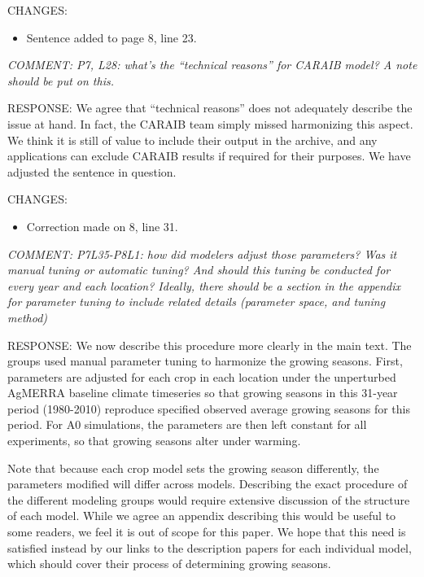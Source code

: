 \documentclass[gmd, manuscript]{copernicus} %
\begin{document}
CHANGES:
\begin{itemize}
    \item Sentence added to page 8, line 23.
\end{itemize}

\smallskip

\textcolor{dark-gray}{\textit{COMMENT: P7, L28: what’s the “technical reasons” for CARAIB model? A note should be put on this.}}

RESPONSE: We agree that “technical reasons” does not adequately describe the issue at hand. In fact, the CARAIB team simply missed harmonizing this aspect. We think it is still of value to include their output in the archive, and any applications can exclude CARAIB results if required for their purposes. We have adjusted the sentence in question.
\smallskip

CHANGES:
\begin{itemize}
    \item Correction made on 8, line 31.
\end{itemize}

\smallskip

\textcolor{dark-gray}{\textit{COMMENT: P7L35-P8L1: how did modelers adjust those parameters? Was it manual tuning or automatic tuning? And should this tuning be conducted for every year and each location? Ideally, there should be a section in the appendix for parameter tuning to include related details (parameter space, and tuning method)}}

RESPONSE: We now describe this procedure more clearly in the main text. The groups used manual parameter tuning to harmonize the growing seasons. First, parameters are adjusted for each crop in each location under the unperturbed AgMERRA baseline climate timeseries so that growing seasons in this 31-year period (1980-2010) reproduce specified observed average growing seasons for this period. For A0 simulations, the parameters are then left constant for all experiments, so that growing seasons alter under warming. 

Note that because each crop model sets the growing season differently, the parameters modified will differ across models. Describing the exact procedure of the different modeling groups would require extensive discussion of the structure of each model. While we agree an appendix describing this would be useful to some readers, we feel it is out of scope for this paper. We hope that this need is satisfied instead by our links to the description papers for each individual model, which should cover their process of determining growing seasons.
\smallskip
\end{document}
